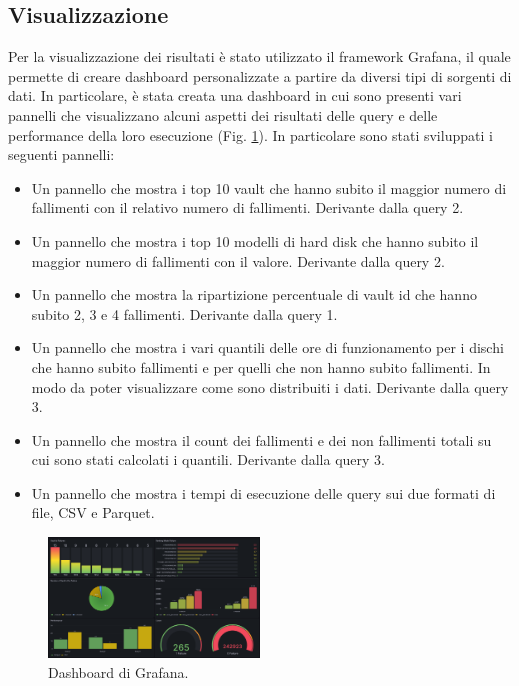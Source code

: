 \documentclass[conference]{IEEEtran}
\begin{document}
\subsection{Visualizzazione}
Per la visualizzazione dei risultati è stato utilizzato il framework Grafana, il quale permette di creare dashboard personalizzate a partire da diversi tipi di sorgenti di dati. In particolare, è stata creata una dashboard in cui sono presenti vari pannelli che visualizzano alcuni aspetti dei risultati delle query e delle performance della loro esecuzione (Fig. \ref{fig:grafana_dashboard}).
In particolare sono stati sviluppati i seguenti pannelli:
\begin{itemize}
    \item Un pannello che mostra i top 10 vault che hanno subito il maggior numero di fallimenti con il relativo numero di fallimenti. Derivante dalla query 2.
    \item Un pannello che mostra i top 10 modelli di hard disk che hanno subito il maggior numero di fallimenti con il valore. Derivante dalla query 2.
    \item Un pannello che mostra la ripartizione percentuale di vault id che hanno subito 2, 3 e 4 fallimenti. Derivante dalla query 1.
    \item Un pannello che mostra i vari quantili delle ore di funzionamento per i dischi che hanno subito fallimenti e per quelli che non hanno subito fallimenti. In modo da poter visualizzare come sono distribuiti i dati. Derivante dalla query 3.
    \item Un pannello che mostra il count dei fallimenti e dei non fallimenti totali su cui sono stati calcolati i quantili. Derivante dalla query 3.
    \item Un pannello che mostra i tempi di esecuzione delle query sui due formati di file, CSV e Parquet.
\end{itemize}
\begin{figure}[H]
    \centerline{\includegraphics[width=0.5\textwidth]{res/grafana_dashboard.png}}
    \caption{Dashboard di Grafana.}
    \label{fig:grafana_dashboard}
\end{figure}
\end{document}
